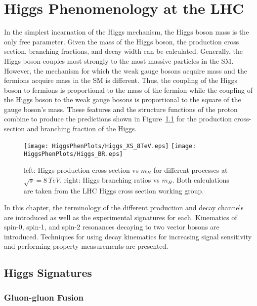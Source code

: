 \chapter{Higgs Phenomenology at the LHC}
\label{sec:HiggsPhen}

In the simplest incarnation of the Higgs mechanism, the Higgs boson
mass is the only free parameter.  Given the mass of the Higgs 
boson, the production cross section, branching fractions, and 
decay width can be calculated.
Generally, the Higgs boson 
couples most strongly to the most massive particles in the 
SM.  However, the mechanism for which the weak gauge 
bosons acquire mass and the fermions acquire mass in the SM is 
different.  
Thus, the coupling of the Higgs boson to fermions is proportional 
to the mass of the fermion while the coupling of the 
Higgs boson to the weak gauge bosons is proportional to the square 
of the gauge boson's mass. These features and the structure 
functions of the proton combine to produce the predictions shown in 
Figure~\ref{fig:HiggsProdXS} for the production cross-section and 
branching fraction of the Higgs.  

\begin{figure}
\begin{center}
\texttt{[image: HiggsPhenPlots/Higgs\_XS\_8TeV.eps]}
\texttt{[image: HiggsPhenPlots/Higgs\_BR.eps]}
\caption{left: Higgs production cross section vs $m_H$ for 
different processes at $\sqrt{s}=8~TeV$. right: Higgs branching
ratios vs $m_H$.  Both calculations are taken from the LHC Higgs
cross section working group. }
\label{fig:HiggsProdXS}
\end{center}
\end{figure}

In this chapter, the terminology of the different production and 
decay channels are introduced as well as the experimental 
signatures for each.  Kinematics of spin-0, spin-1, 
and spin-2 resonances decaying to two vector bosons are introduced.  
Techniques for using decay kinematics for increasing signal 
sensitivity and performing property measurements are presented.  

\section{Higgs Signatures}

\subsection{Gluon-gluon Fusion}
\label{sec:ggHiggs}

